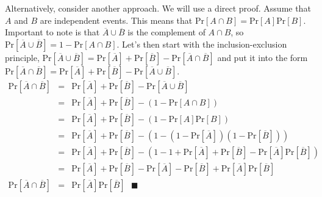 \documentclass[11pt]{article}
\begin{document}
\begin{enumerate}
{{Alternatively, consider another approach. We will use a direct proof. Assume that $A$ and $B$ are independent events. This means that $\text{Pr}[A\cap B]=\text{Pr}[A]\text{Pr}[B]$.
Important to note is that $\overline{A}\cup\overline{B}$ is the complement of $A\cap B$, so $\text{Pr}[\overline{A}\cup\overline{B}]=1-\text{Pr}[A\cap B]$.
Let's then start with the inclusion-exclusion principle, $\text{Pr}[\overline{A}\cup\overline{B}]=\text{Pr}[\overline{A}]+\text{Pr}[\overline{B}]-\text{Pr}[\overline{A}\cap\overline{B}]$ and put it into the form $\text{Pr}[\overline{A}\cap\overline{B}]=\text{Pr}[\overline{A}]+\text{Pr}[\overline{B}]-\text{Pr}[\overline{A}\cup\overline{B}]$.
\begin{eqnarray*}
\text{Pr}[\overline{A}\cap\overline{B}]&=&\text{Pr}[\overline{A}]+\text{Pr}[\overline{B}]-\text{Pr}[\overline{A}\cup\overline{B}]\\
                                       &=&\text{Pr}[\overline{A}]+\text{Pr}[\overline{B}]-(1-\text{Pr}[A\cap B])\\
                                       &=&\text{Pr}[\overline{A}]+\text{Pr}[\overline{B}]-(1-\text{Pr}[A]\text{Pr}[B])\\
                                       &=&\text{Pr}[\overline{A}]+\text{Pr}[\overline{B}]-(1-(1-\text{Pr}[\overline{A}])(1-\text{Pr}[\overline{B}]))\\
                                       &=&\text{Pr}[\overline{A}]+\text{Pr}[\overline{B}]-(1-1+\text{Pr}[\overline{A}]+\text{Pr}[\overline{B}]-\text{Pr}[\overline{A}]\text{Pr}[\overline{B}])\\
                                       &=&\text{Pr}[\overline{A}]+\text{Pr}[\overline{B}]-\text{Pr}[\overline{A}]-\text{Pr}[\overline{B}]+\text{Pr}[\overline{A}]\text{Pr}[\overline{B}]\\
\text{Pr}[\overline{A}\cap\overline{B}]&=&\text{Pr}[\overline{A}]\text{Pr}[\overline{B}] \text{ }\blacksquare
\end{eqnarray*}

}} \fi

\end{enumerate}
\end{document}
